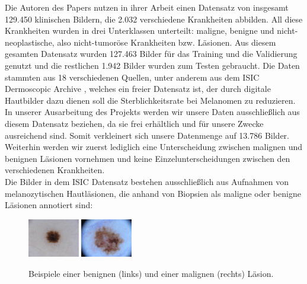 \documentclass[%
   10pt,              %
   a4paper,           %
   DIV10,             %
]{scrartcl}%
\begin{document}
Die Autoren des Papers nutzen in ihrer Arbeit einen Datensatz von insgesamt 129.450 klinischen Bildern, die 2.032 verschiedene Krankheiten abbilden. All diese Krankheiten wurden in drei Unterklassen unterteilt: maligne, benigne und nicht-neoplastische, also nicht-tumoröse Krankheiten bzw. Läsionen. Aus diesem gesamten Datensatz wurden 127.463 Bilder für das Training und die Validierung genutzt und die restlichen 1.942 Bilder wurden zum Testen gebraucht. Die Daten stammten aus 18 verschiedenen Quellen, unter anderem aus dem ISIC Dermoscopic Archive \cite{ISIC}, welches ein freier Datensatz ist, der durch digitale Hautbilder dazu dienen soll die Sterblichkeitsrate bei Melanomen zu reduzieren. In unserer Ausarbeitung des Projekts werden wir unsere Daten ausschließlich aus diesem Datensatz beziehen, da sie frei erhältlich und für unsere Zwecke ausreichend sind. Somit verkleinert sich unsere Datenmenge auf 13.786 Bilder. Weiterhin werden wir zuerst lediglich eine Unterscheidung zwischen malignen und benignen Läsionen vornehmen und keine Einzelunterscheidungen zwischen den verschiedenen Krankheiten.\\
\noindent Die Bilder in dem ISIC Datensatz bestehen ausschließlich aus Aufnahmen von melanozytischen Hautläsionen, die anhand von Biopsien als maligne oder benigne Läsionen annotiert sind: 

\begin{figure}[h!]
	\centering
	\includegraphics[width=0.2\textwidth]{fig/example1.jpg}
	\includegraphics[width=0.2\textwidth]{fig/example2.jpg}
	\caption{Beispiele einer benignen (links) und einer malignen (rechts) Läsion.}
	\label{fig_example}
\end{figure}
\end{document}
